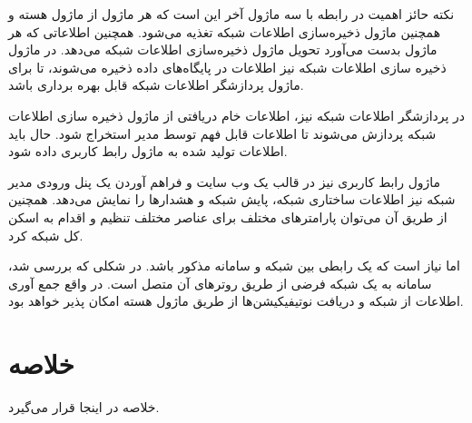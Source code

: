 نکته حائز اهمیت در رابطه با سه ماژول آخر این است که هر ماژول از ماژول هسته و همچنین ماژول ذخیره‌سازی اطلاعات شبکه تغذیه می‌شود. همچنین اطلاعاتی که هر ماژول بدست می‌آورد تحویل ماژول ذخیره‌سازی اطلاعات شبکه می‌دهد. در ماژول ذخیره سازی اطلاعات شبکه نیز اطلاعات در پایگاه‌های داده ذخیره می‌شوند، تا برای ماژول پردازشگر اطلاعات شبکه قابل بهره برداری باشد.

در پردازشگر اطلاعات شبکه نیز، اطلاعات خام دریافتی از ماژول ذخیره سازی اطلاعات شبکه پردازش می‌شوند تا اطلاعات قابل فهم توسط مدیر استخراج شود. حال باید اطلاعات تولید شده به ماژول رابط کاربری داده شود.

ماژول رابط کاربری نیز در قالب یک وب سایت و فراهم آوردن یک پنل ورودی مدیر شبکه نیز اطلاعات ساختاری شبکه، پایش شبکه و هشدارها را نمایش می‌دهد. همچنین از طریق آن می‌توان پارامترهای مختلف برای عناصر مختلف تنظیم و اقدام به اسکن کل شبکه کرد.

اما نیاز است که یک رابطی بین شبکه و سامانه مذکور باشد. در شکلی که بررسی شد، سامانه به یک شبکه فرضی از طریق روترهای آن متصل است. در واقع جمع آوری اطلاعات از شبکه و دریافت نوتیفیکیشن‌ها از طریق ماژول هسته  امکان پذیر خواهد بود.






\section{خلاصه}


خلاصه در اینجا قرار می‌گیرد.

